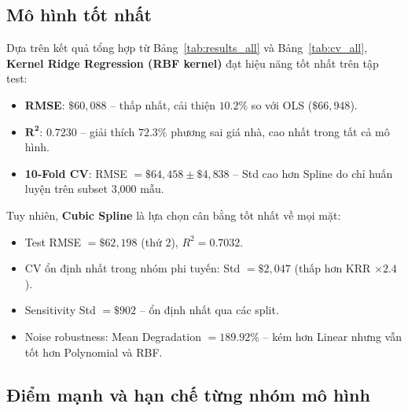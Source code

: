 \documentclass[12pt,a4paper]{article}
\begin{document}
\subsection{Mô hình tốt nhất}

Dựa trên kết quả tổng hợp từ Bảng~\ref{tab:results_all} và
Bảng~\ref{tab:cv_all}, \textbf{Kernel Ridge Regression (RBF kernel)}
đạt hiệu năng tốt nhất trên tập test:

\begin{itemize}
  \item \textbf{RMSE}: $\$60{,}088$ -- thấp nhất, cải thiện
        $\mathbf{10.2\%}$ so với OLS ($\$66{,}948$).
  \item $\mathbf{R^2}$: $0.7230$ -- giải thích $72.3\%$ phương sai
        giá nhà, cao nhất trong tất cả mô hình.
  \item \textbf{10-Fold CV}: RMSE $= \$64{,}458 \pm \$4{,}838$ --
        Std cao hơn Spline do chỉ huấn luyện trên subset 3{,}000 mẫu.
\end{itemize}

Tuy nhiên, \textbf{Cubic Spline} là lựa chọn cân bằng tốt nhất
về mọi mặt:
\begin{itemize}
  \item Test RMSE $= \$62{,}198$ (thứ 2), $R^2 = 0.7032$.
  \item CV ổn định nhất trong nhóm phi tuyến: Std $= \$2{,}047$
        (thấp hơn KRR $\times 2.4$).
  \item Sensitivity Std $= \$902$ -- ổn định nhất qua các split.
  \item Noise robustness: Mean Degradation $= 189.92\%$ -- kém hơn
        Linear nhưng vẫn tốt hơn Polynomial và RBF.
\end{itemize}

\subsection{Điểm mạnh và hạn chế từng nhóm mô hình}
\end{document}
